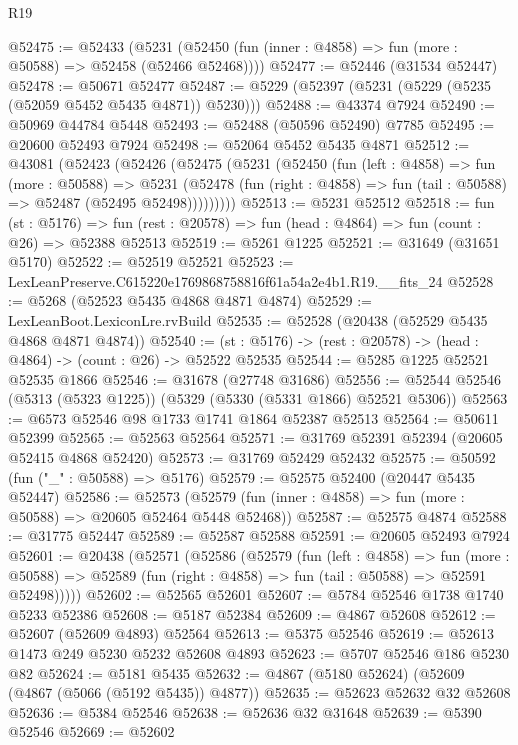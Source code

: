 \begin{lexlean}{R19}
\begin{coremodule}
@52475 := @52433
    (@5231 (@52450 (fun (inner : @4858) => fun (more : @50588) => @52458 (@52466 @52468))))
@52477 := @52446 (@31534 @52447)
@52478 := @50671 @52477
@52487 := @5229 (@52397 (@5231 (@5229 (@5235 (@52059 @5452 @5435 @4871)) @5230)))
@52488 := @43374 @7924
@52490 := @50969 @44784 @5448
@52493 := @52488 (@50596 @52490) @7785
@52495 := @20600 @52493 @7924
@52498 := @52064 @5452 @5435 @4871
@52512 := @43081
    (@52423
      (@52426
        (@52475
          (@5231
            (@52450
              (fun (left : @4858) =>
              fun (more : @50588) =>
              @5231
                (@52478
                  (fun (right : @4858) => fun (tail : @50588) => @52487 (@52495 @52498)))))))))
@52513 := @5231 @52512
@52518 := fun (st : @5176) =>
  fun (rest : @20578) => fun (head : @4864) => fun (count : @26) => @52388 @52513
@52519 := @5261 @1225
@52521 := @31649 (@31651 @5170)
@52522 := @52519 @52521
@52523 := LexLeanPreserve.C615220e1769868758816f61a54a2e4b1.R19.__fits_24
@52528 := @5268 (@52523 @5435 @4868 @4871 @4874)
@52529 := LexLeanBoot.LexiconLre.rvBuild
@52535 := @52528 (@20438 (@52529 @5435 @4868 @4871 @4874))
@52540 := (st : @5176) -> (rest : @20578) -> (head : @4864) -> (count : @26) -> @52522 @52535
@52544 := @5285 @1225 @52521 @52535 @1866
@52546 := @31678 (@27748 @31686)
@52556 := @52544 @52546 (@5313 (@5323 @1225)) (@5329 (@5330 (@5331 @1866) @52521 @5306))
@52563 := @6573 @52546 @98 @1733 @1741 @1864 @52387 @52513
@52564 := @50611 @52399
@52565 := @52563 @52564
@52571 := @31769 @52391 @52394 (@20605 @52415 @4868 @52420)
@52573 := @31769 @52429 @52432
@52575 := @50592 (fun ("_" : @50588) => @5176)
@52579 := @52575 @52400 (@20447 @5435 @52447)
@52586 := @52573 (@52579 (fun (inner : @4858) => fun (more : @50588) => @20605 @52464 @5448 @52468))
@52587 := @52575 @4874
@52588 := @31775 @52447
@52589 := @52587 @52588
@52591 := @20605 @52493 @7924
@52601 := @20438
    (@52571
      (@52586
        (@52579
          (fun (left : @4858) =>
          fun (more : @50588) =>
          @52589 (fun (right : @4858) => fun (tail : @50588) => @52591 @52498)))))
@52602 := @52565 @52601
@52607 := @5784 @52546 @1738 @1740 @5233 @52386
@52608 := @5187 @52384
@52609 := @4867 @52608
@52612 := @52607 (@52609 @4893) @52564
@52613 := @5375 @52546
@52619 := @52613 @1473 @249 @5230 @5232 @52608 @4893
@52623 := @5707 @52546 @186 @5230 @82
@52624 := @5181 @5435
@52632 := @4867 (@5180 @52624) (@52609 (@4867 (@5066 (@5192 @5435)) @4877))
@52635 := @52623 @52632 @32 @52608
@52636 := @5384 @52546
@52638 := @52636 @32 @31648
@52639 := @5390 @52546
@52669 := @52602

\end{coremodule}
\end{lexlean}

